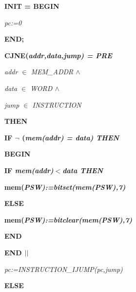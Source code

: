 \begin{sloppypar}
\hspace*{0.10in}  

\hspace*{0.10in}

\hspace*{0.10in}\bf INIT \rm = \bf BEGIN

\hspace*{0.20in}\it pc\rm :=\rm 0

\hspace*{0.10in}\bf END\rm ;

\hspace*{0.10in}  

\hspace*{0.10in}\bf CJNE\rm (\it addr\rm ,\it data\rm ,\it jump\rm ) \rm = \bf PRE

\hspace*{0.20in}\it addr $\in$  \it MEM\_ADDR  $\land$ 

\hspace*{0.20in}\it data $\in$  \it WORD  $\land$ 

\hspace*{0.20in}\it jump $\in$  \it INSTRUCTION

\hspace*{0.10in}\bf THEN

\hspace*{0.20in}\bf IF  $\neg$ \rm (\it mem\rm (\it addr\rm ) \rm = \it data\rm ) \bf THEN

\hspace*{0.30in}\bf BEGIN

\hspace*{0.40in}\bf IF \it mem\rm (\it addr\rm )$<$\it data \bf THEN

\hspace*{0.50in}\bf mem\rm (\it PSW\rm )\rm :=\it bitset\rm (\it mem\rm (\it PSW\rm )\rm ,\rm 7\rm )

\hspace*{0.40in}\bf ELSE

\hspace*{0.50in}\bf mem\rm (\it PSW\rm )\rm :=\it bitclear\rm (\it mem\rm (\it PSW\rm )\rm ,\rm 7\rm )

\hspace*{0.40in}\bf END

\hspace*{0.30in}\bf END  $\mbox{$\mid\mid$}$ 

\hspace*{0.30in}\it pc\rm :=\it INSTRUCTION\_IJUMP\rm (\it pc\rm ,\it jump\rm )

\hspace*{0.20in}\bf ELSE


\end{sloppypar}
